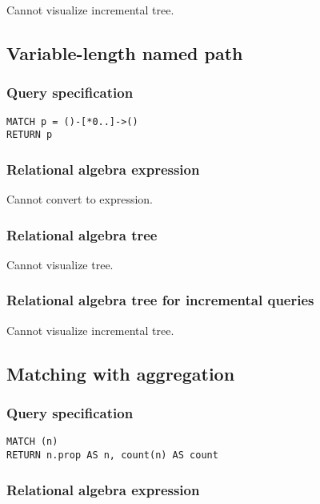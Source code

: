 Cannot visualize incremental tree.

\subsection{Variable-length named path}

\subsubsection*{Query specification}

\begin{lstlisting}
MATCH p = ()-[*0..]->()
RETURN p
\end{lstlisting}

\subsubsection*{Relational algebra expression}

Cannot convert to expression.

\subsubsection*{Relational algebra tree}

Cannot visualize tree.

\subsubsection*{Relational algebra tree for incremental queries}

Cannot visualize incremental tree.

\subsection{Matching with aggregation}

\subsubsection*{Query specification}

\begin{lstlisting}
MATCH (n)
RETURN n.prop AS n, count(n) AS count
\end{lstlisting}

\subsubsection*{Relational algebra expression}

